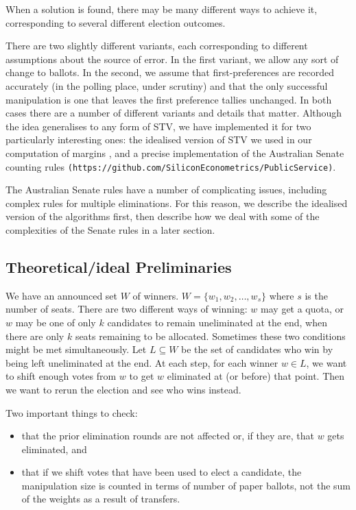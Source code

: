 \documentclass[10pt,a4paper]{article}
\begin{document}
When a solution is found, there may be many different ways to achieve it, corresponding to several different election outcomes.  

There are two slightly different variants, each corresponding to different assumptions about the source of error.  In the first variant, we allow any sort of change to ballots.  In the second, we assume that first-preferences are recorded accurately (in the polling place, under scrutiny) and that the only successful manipulation is one that leaves the first preference tallies unchanged.  In both cases there are a number of different variants and details that matter.  Although the idea generalises to any form of STV, we have implemented it for two particularly interesting ones: the idealised version of STV we used in our computation of margins \cite{blom2015efficient}, and a precise implementation of the Australian Senate counting rules \verb|(https://github.com/SiliconEconometrics/PublicService)|.

The Australian Senate rules have a number of complicating issues, including complex rules for multiple eliminations.  For this reason, we describe the idealised version of the algorithms first, then describe how we deal with some of the complexities of the Senate rules in a later section.

\subsection{Theoretical/ideal Preliminaries}
We have an announced set $W$ of winners.  $W = \{w_1, w_2, \ldots, w_s \}$ where $s$ is the number of seats.  There are two different ways of winning: $w$ may get a quota, or $w$ may be one of only $k$ candidates to remain uneliminated at the end, when there are only $k$ seats remaining to be allocated.  Sometimes these two conditions might be met simultaneously.  Let $L \subseteq W$ be the set of candidates who win by being left uneliminated at the end.  At each step, for each winner $w \in L$, we want to shift enough votes from $w$ to get $w$ eliminated at (or before) that point.  Then we want to rerun the election and see who wins instead.

Two important things to check:
\begin{itemize}
	\item that the prior elimination rounds are not affected or, if they are, that $w$ gets eliminated, and
	\item that if we shift votes that have been used to elect a candidate, the manipulation size is counted in terms of number of paper ballots, not the sum of the weights as a result of transfers.
\end{itemize}
\end{document}
